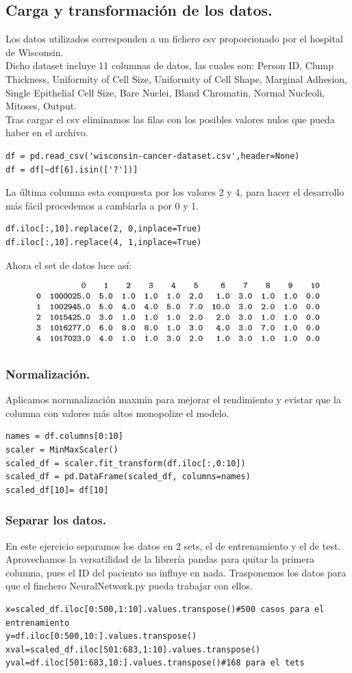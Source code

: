 \documentclass[a4paper,10pt]{article}
\begin{document}
\subsection{Carga y transformación de los datos.}
Los datos utilizados corresponden a un fichero csv proporcionado por el hospital de Wisconsin.\\
Dicho dataset incluye 11 columnas de datos, las cuales son: Person ID, Clump Thickness, Uniformity of Cell Size, Uniformity of Cell Shape, Marginal Adhesion, Single Epithelial Cell Size, Bare Nuclei, Bland Chromatin, Normal Nucleoli, Mitoses, Output.\\
Tras cargar el csv eliminamos las filas con los posibles valores nulos que pueda haber en el archivo.
\begin{lstlisting}
df = pd.read_csv('wisconsin-cancer-dataset.csv',header=None)
df = df[~df[6].isin(['?'])]
\end{lstlisting}
La última columna esta compuesta por los valores 2 y 4,  para hacer el desarrollo más fácil procedemos a cambiarla a por 0 y 1.
\begin{lstlisting}
df.iloc[:,10].replace(2, 0,inplace=True)
df.iloc[:,10].replace(4, 1,inplace=True)
\end{lstlisting}
Ahora el set de datos luce así: 
\begin{figure}[H]
\centering
\includegraphics{Annotation 2020-03-23 185932.png}
\end{figure}
\subsubsection{Normalización.}
Aplicamos normnalización maxmin para mejorar el rendimiento y evistar que la columna con valores más altos monopolize el modelo. 
\begin{lstlisting}
names = df.columns[0:10]
scaler = MinMaxScaler() 
scaled_df = scaler.fit_transform(df.iloc[:,0:10]) 
scaled_df = pd.DataFrame(scaled_df, columns=names)
scaled_df[10]= df[10]
\end{lstlisting}
\subsubsection{Separar los datos.}
En este ejercicio separamos los datos en 2 sets, el de entrenamiento y el de test. Aprovechamos la versatilidad de la librería pandas para quitar la primera columna, pues el ID del paciento no influye en nada. Trasponemos los datos para que el finchero NeuralNetwork.py pueda trabajar con ellos.
\begin{lstlisting}
x=scaled_df.iloc[0:500,1:10].values.transpose()#500 casos para el entrenamiento
y=df.iloc[0:500,10:].values.transpose()
xval=scaled_df.iloc[501:683,1:10].values.transpose()
yval=df.iloc[501:683,10:].values.transpose()#168 para el tets
\end{lstlisting}
\end{document}
